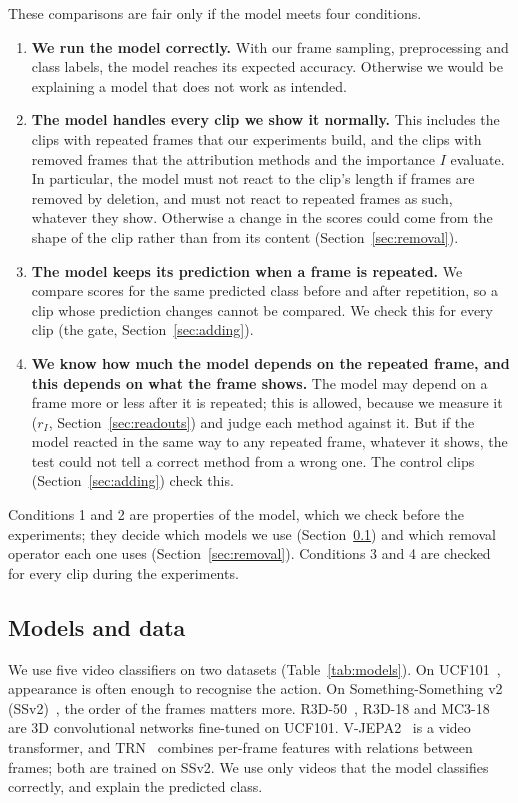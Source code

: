 These comparisons are fair only if the model meets four conditions.
\begin{enumerate}
  \item \textbf{We run the model correctly.} With our frame sampling, preprocessing and class labels, the model reaches its expected accuracy. Otherwise we would be explaining a model that does not work as intended.
  \item \textbf{The model handles every clip we show it normally.} This includes the clips with repeated frames that our experiments build, and the clips with removed frames that the attribution methods and the importance $I$ evaluate. In particular, the model must not react to the clip's length if frames are removed by deletion, and must not react to repeated frames as such, whatever they show. Otherwise a change in the scores could come from the shape of the clip rather than from its content (Section~\ref{sec:removal}).
  \item \textbf{The model keeps its prediction when a frame is repeated.} We compare scores for the same predicted class before and after repetition, so a clip whose prediction changes cannot be compared. We check this for every clip (the gate, Section~\ref{sec:adding}).
  \item \textbf{We know how much the model depends on the repeated frame, and this depends on what the frame shows.} The model may depend on a frame more or less after it is repeated; this is allowed, because we measure it ($r_I$, Section~\ref{sec:readouts}) and judge each method against it. But if the model reacted in the same way to any repeated frame, whatever it shows, the test could not tell a correct method from a wrong one. The control clips (Section~\ref{sec:adding}) check this.
\end{enumerate}
Conditions 1 and 2 are properties of the model, which we check before the experiments; they decide which models we use (Section~\ref{sec:models}) and which removal operator each one uses (Section~\ref{sec:removal}). Conditions 3 and 4 are checked for every clip during the experiments.

\subsection{Models and data}
\label{sec:models}

We use five video classifiers on two datasets (Table~\ref{tab:models}).
On UCF101~\citep{soomro2012ucf101}, appearance is often enough to recognise the action.
On Something-Something v2 (SSv2)~\citep{raghav_goyal_0d4c7f22}, the order of the frames matters more.
R3D-50~\citep{kensho_hara_bb74ffbe}, R3D-18 and MC3-18~ are 3D convolutional networks fine-tuned on UCF101.
V-JEPA2~\citep{mido_assran_c74ff668} is a video transformer, and TRN~ combines per-frame features with relations between frames; both are trained on SSv2.
We use only videos that the model classifies correctly, and explain the predicted class.

